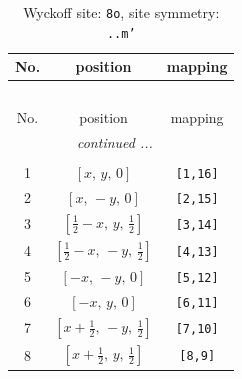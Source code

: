 \documentclass[fleqn,8pt]{jsarticle}
\begin{document}
\begin{longtable}{ccc}
\caption{Wyckoff site: {\tt 8o}, site symmetry: {\tt ..m'}}
 \\
 \hline \hline
No. & position & mapping \\ \hline \endfirsthead

\multicolumn{2}{l}{\tablename\ \thetable{}} \\
 \hline \hline
No. & position & mapping \\ \hline \endhead

 \hline \hline
\multicolumn{2}{r}{\footnotesize\it continued ...} \\ \endfoot

 \hline \hline
\multicolumn{2}{r}{} \\ \endlastfoot

1 & $\left[ x,\, y,\, 0 \right]$ & {\tt [1,16]} \\ \hline
2 & $\left[ x,\, - y,\, 0 \right]$ & {\tt [2,15]} \\ \hline
3 & $\left[ \frac{1}{2} - x,\, y,\, \frac{1}{2} \right]$ & {\tt [3,14]} \\ \hline
4 & $\left[ \frac{1}{2} - x,\, - y,\, \frac{1}{2} \right]$ & {\tt [4,13]} \\ \hline
5 & $\left[ - x,\, - y,\, 0 \right]$ & {\tt [5,12]} \\ \hline
6 & $\left[ - x,\, y,\, 0 \right]$ & {\tt [6,11]} \\ \hline
7 & $\left[ x + \frac{1}{2},\, - y,\, \frac{1}{2} \right]$ & {\tt [7,10]} \\ \hline
8 & $\left[ x + \frac{1}{2},\, y,\, \frac{1}{2} \right]$ & {\tt [8,9]} \\
\end{longtable}
\renewcommand{\arraystretch}{1.2}
\end{document}
